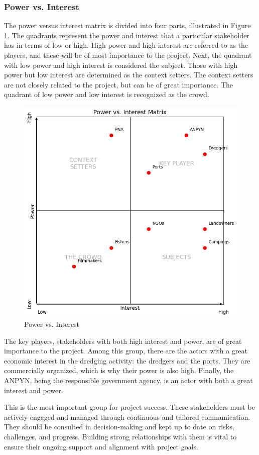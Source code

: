 \subsubsection{Power vs. Interest}
The power versus interest matrix is divided into four parts, illustrated in Figure \ref{fig:power-interest}. The quadrants represent the power and interest that a particular stakeholder has in terms of low or high. High power and high interest are referred to as the players, and these will be of most importance to the project. Next, the quadrant with low power and high interest is considered the subject. Those with high power but low interest are determined as the context setters. The context setters are not closely related to the project, but can be of great importance. The quadrant of low power and low interest is recognized as the crowd.

\begin{figure}[H]
    \centering
    \includegraphics[width=0.70\linewidth]{figures/ch3/PowerVSInterest.png}
    \caption{Power vs. Interest}
    \label{fig:power-interest}
\end{figure}

The key players, stakeholders with both high interest and power, are of great importance to the project. Among this group, there are the actors with a great economic interest in the dredging activity: the dredgers and the ports. They are commercially organized, which is why their power is also high. Finally, the ANPYN, being the responsible government agency, is an actor with both a great interest and power.

This is the most important group for project success. These stakeholders must be actively engaged and managed through continuous and tailored communication. They should be consulted in decision-making and kept up to date on risks, challenges, and progress. Building strong relationships with them is vital to ensure their ongoing support and alignment with project goals.

